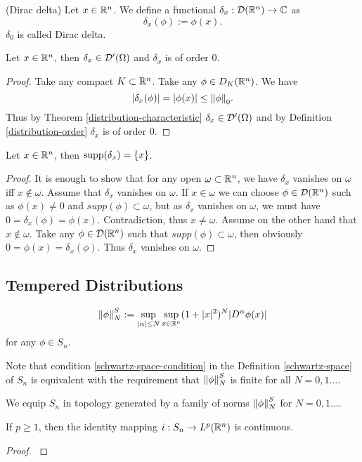 \documentclass[main.tex]{subfiles}
\begin{document}
\begin{definition}(Dirac delta)
\label{dirac-delta}
Let $x\in\mathbb{R}^n$. We define a functional $\delta_x:\mathcal{D}(\mathbb{R}^n)\to\mathbb{C}$ as
\begin{equation}
\delta_x(\phi):= \phi(x).
\end{equation}
$\delta_0$ is called Dirac delta. 
\end{definition}
\begin{theorem}
Let $x\in\mathbb{R}^n$, then $\delta_x\in\mathcal{D}'(\Omega)$ and $\delta_x$ is of order $0$.
\end{theorem}
\begin{proof}
Take any compact $K\subset \mathbb{R}^n$. Take any $\phi\in D_K(\mathbb{R}^n)$.
We have
\begin{equation}
|\delta_x(\phi)| = |\phi(x)| \leq \norm{\phi}_0.
\end{equation}
Thus by Theorem \ref{distribution-characteristic} $\delta_x\in\mathcal{D}'(\Omega)$ and by Definition \ref{distribution-order} $\delta_x$ is of order $0$.
\end{proof}
\begin{theorem}
Let $x\in\mathbb{R}^n$, then $\text{supp}(\delta_x)=\{x\}$.
\end{theorem}
\begin{proof}
It is enough to show that for any open $\omega\subset\mathbb{R}^n$, we have $\delta_x$ vanishes on $\omega$ iff $x\not\in\omega$.
Assume that $\delta_x$ vanishes on $\omega$. If $x\in\omega$ we can choose $\phi\in\mathcal{D}(\mathbb{R}^n)$ such as $\phi(x)\not=0$ and $supp(\phi)\subset \omega$, but as $\delta_x$ vanishes on $\omega$, we must have $0 = \delta_x(\phi) = \phi(x)$. Contradiction, thus $x\not=\omega$.
Assume on the other hand that $x\not\in\omega$. Take any $\phi\in\mathcal{D}(\mathbb{R}^n)$ such that $supp(\phi)\subset \omega$, then obviously $0 = \phi(x) = \delta_x(\phi)$. Thus $\delta_x$ vanishes on $\omega$. 
\end{proof}
\subsection{Tempered Distributions}
\begin{definition}
\begin{equation}
\norm{\phi}^S_N := \sup_{|\alpha|\leq N} \sup_{x\in \mathbb{R}^n} (1 + |x|^2)^N |D^\alpha \phi(x)|
\end{equation}
for any $\phi\in S_n$.
\end{definition}
Note that condition \ref{schwartz-space-condition} in the Definition \ref{schwartz-space} of $S_n$ is equivalent with the requirement that $\norm{\phi}^S_N$ is finite for all $N=0,1\dots$.
\begin{definition}
We equip $S_n$ in topology generated by a family of norms $\norm{\phi}^S_N$ for $N=0,1\dots$.
\end{definition}
\begin{theorem}
\label{schwartz-Lp-embeding}
If $p\geq 1$, then the identity mapping $i:S_n\to L^p(\mathbb{R}^n)$ is continuous. 
\end{theorem}
\begin{proof}
\cite[See][Problem 1.30]{georgiev2015}
\end{proof}
\end{document}

